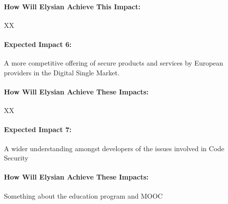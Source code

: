 \documentclass[a4paper,11pt]{article}
\newcommand{\project}[1]{\textbf{#1}\xspace}
\newcommand{\SECURITY}{\project{Elysian}}
\newcommand{\TheProject}{\SECURITY}
\begin{document}
\begin{mdframed}[backgroundcolor=gray!10]
\paragraph{How Will \TheProject{} Achieve This Impact:}
XX
\end{mdframed}
\begin{mdframed}[backgroundcolor=blue!5]
\paragraph{Expected Impact 6:}
A more competitive offering of secure products and services by European providers in the Digital Single Market.
\end{mdframed}

\begin{mdframed}[backgroundcolor=gray!10]
\paragraph{How Will \TheProject{} Achieve These Impacts:}
XX
\end{mdframed}

\begin{mdframed}[backgroundcolor=blue!5]
\paragraph{Expected Impact 7:}
A wider understanding amongst developers of the issues involved in Code Security
\end{mdframed}

\begin{mdframed}[backgroundcolor=gray!10]
\paragraph{How Will \TheProject{} Achieve These Impacts:}
Something about the education program and MOOC
\end{mdframed}

\end{document}
